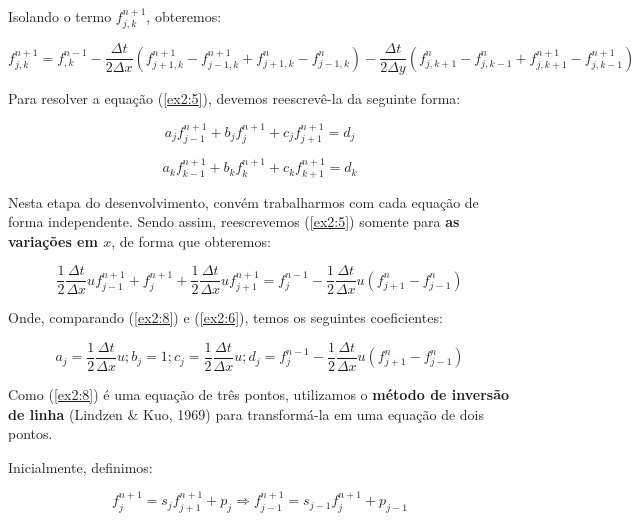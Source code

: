 \documentclass[11pt]{article}
\begin{document}
Isolando o termo \(f^{n+1}_{j,k}\), obteremos:

\begin{equation}
    f^{n+1}_{j,k} = f^{n-1}_{,k} - \frac{\Delta{t}}{2\Delta{x}}(f^{n+1}_{j+1,k} - f^{n+1}_{j-1,k} + f^{n}_{j+1,k} - f^{n}_{j-1,k}) - \frac{\Delta{t}}{2\Delta{y}}( f^{n}_{j,k+1} - f^{n}_{j,k-1} + f^{n+1}_{j,k+1} - f^{n+1}_{j,k-1})
    \label{ex2:5}
\end{equation}

Para resolver a equação (\ref{ex2:5}), devemos reescrevê-la da seguinte
forma:

\begin{equation}
   a_jf^{n+1}_{j-1} + b_jf^{n+1}_{j} + c_jf^{n+1}_{j+1} = d_j
   \label{ex2:6}
\end{equation}

\begin{equation}
    a_kf^{n+1}_{k-1} + b_kf^{n+1}_{k} + c_kf^{n+1}_{k+1} = d_k
    \label{ex2:7}
\end{equation}

Nesta etapa do desenvolvimento, convém trabalharmos com cada equação de
forma independente. Sendo assim, reescrevemos (\ref{ex2:5}) somente para
\textbf{as variações em \(x\)}, de forma que obteremos:

\begin{equation}
    \frac{1}{2}\frac{\Delta{t}}{\Delta{x}}uf^{n+1}_{j-1} + f^{n+1}_{j} + \frac{1}{2}\frac{\Delta{t}}{\Delta{x}}uf^{n+1}_{j+1}  = f^{n-1}_{j} - \frac{1}{2}\frac{\Delta{t}}{\Delta{x}}u(f^{n}_{j+1} - f^{n}_{j-1})
    \label{ex2:8}
\end{equation}

Onde, comparando (\ref{ex2:8}) e (\ref{ex2:6}), temos os seguintes
coeficientes:

\begin{equation}
a_j = \frac{1}{2}\frac{\Delta{t}}{\Delta{x}}u; b_j = 1; c_j = \frac{1}{2}\frac{\Delta{t}}{\Delta{x}}u; d_j = f^{n-1}_{j} - \frac{1}{2}\frac{\Delta{t}}{\Delta{x}}u(f^{n}_{j+1} - f^{n}_{j-1})
\label{ex2:9}
\end{equation}

Como (\ref{ex2:8}) é uma equação de três pontos, utilizamos o
\textbf{método de inversão de linha} (Lindzen \& Kuo, 1969) para
transformá-la em uma equação de dois pontos.

Inicialmente, definimos:

\begin{equation}
    f^{n+1}_{j} = s_{j}f^{n+1}_{j+1} + p_j \Rightarrow f^{n+1}_{j-1} = s_{j-1}f^{n+1}_{j} + p_{j-1}
    \label{ex2:10}
\end{equation}
\end{document}
